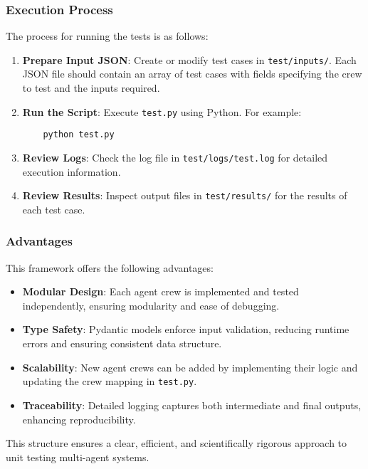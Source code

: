 \subsubsection*{Execution Process}
The process for running the tests is as follows:

\begin{enumerate}
    \item \textbf{Prepare Input JSON}: Create or modify test cases in \texttt{test/inputs/}. Each JSON file should contain an array of test cases with fields specifying the crew to test and the inputs required.
    \item \textbf{Run the Script}: Execute \texttt{test.py} using Python. For example:
    \begin{verbatim}
    python test.py
    \end{verbatim}
    \item \textbf{Review Logs}: Check the log file in \texttt{test/logs/test.log} for detailed execution information.
    \item \textbf{Review Results}: Inspect output files in \texttt{test/results/} for the results of each test case.
\end{enumerate}

\subsubsection*{Advantages}
This framework offers the following advantages:

\begin{itemize}
    \item \textbf{Modular Design}: Each agent crew is implemented and tested independently, ensuring modularity and ease of debugging.
    \item \textbf{Type Safety}: Pydantic models enforce input validation, reducing runtime errors and ensuring consistent data structure.
    \item \textbf{Scalability}: New agent crews can be added by implementing their logic and updating the crew mapping in \texttt{test.py}.
    \item \textbf{Traceability}: Detailed logging captures both intermediate and final outputs, enhancing reproducibility.
\end{itemize}

This structure ensures a clear, efficient, and scientifically rigorous approach to unit testing multi-agent systems.
